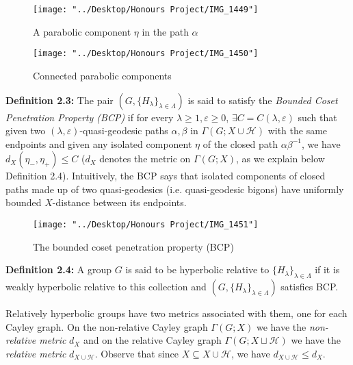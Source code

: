 \documentclass[12pt]{article}
\newcommand{\vs}{\vskip10pt}
\begin{document}
\begin{figure} [H]
	\centering
	\texttt{[image: "../Desktop/Honours Project/IMG\_1449"]}
	\caption{A parabolic component $\eta$ in the path $\alpha$}
	\label{fig:img1449}
\end{figure}

\begin{figure} [H]
	\centering
	\texttt{[image: "../Desktop/Honours Project/IMG\_1450"]}
	\caption{Connected parabolic components}
	\label{fig:img1450}
\end{figure}

	
	\vs 
	
	\textbf{Definition 2.3: } The pair $(G, \{H_{\lambda}\}_{\lambda \in \Lambda})$ is said to satisfy the \textit{Bounded Coset Penetration Property (BCP)} if for every $\lambda \geq 1, \varepsilon \geq 0$, $\exists C = C(\lambda, \varepsilon)$ such that given two $(\lambda, \varepsilon)$-quasi-geodesic paths $\alpha, \beta$ in $\Gamma(G; X \cup \mathcal{H})$ with the same endpoints and given any isolated component $\eta$ of the closed path $\alpha\beta^{-1}$, we have $d_X(\eta_{-}, \eta_{+}) \leq C$ ($d_X$ denotes the metric on $\Gamma(G;X)$, as we explain below Definition 2.4). Intuitively, the BCP says that isolated components of closed paths made up of two quasi-geodesics (i.e. quasi-geodesic bigons) have uniformly bounded $X$-distance between its endpoints. 
	
\begin{figure} [H]
	\centering
	\texttt{[image: "../Desktop/Honours Project/IMG\_1451"]}
	\caption{The bounded coset penetration property (BCP)}
	\label{fig:img1451}
\end{figure}
	
	\vs 
	
	\textbf{Definition 2.4: } A group $G$ is said to be hyperbolic relative to $\{H_{\lambda}\}_{\lambda \in \Lambda}$ if it is weakly hyperbolic relative to this collection and $(G, \{H_{\lambda}\}_{\lambda \in \Lambda})$ satisfies BCP. 
	
	\vs 
	
	Relatively hyperbolic groups have two metrics associated with them, one for each Cayley graph. On the non-relative Cayley graph $\Gamma(G;X)$ we have the \textit{non-relative metric} $d_X$ and on the relative Cayley graph $\Gamma(G; X \sqcup \mathcal{H})$ we have the \textit{relative metric} $d_{X \cup \mathcal{H}}$. Observe that since $X \subseteq X \cup \mathcal{H}$, we have $d_{X \cup \mathcal{H}} \leq d_X$.
	
\end{document}
